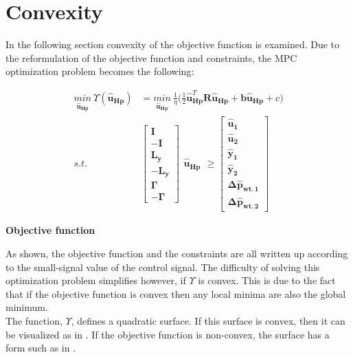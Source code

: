 \section{Convexity}
\label{convexity}
In the following section convexity of the objective function is examined. 
Due to the reformulation of the objective function and constraints, the MPC optimization problem becomes the following: 

\begin{align}
\underset{\bm{\hat{u}_{Hp}}}{min} \:  \Upsilon(\bm{\hat{u}}_{\bm{Hp}}) &= \underset{\bm{\hat{u}_{Hp}}}{min} \:  \frac{1}{\eta}\bigg( \frac{1}{2} \bm{\hat{u}}_{\bm{Hp}}^{T} \bm{R} \bm{\hat{u}}_{\bm{Hp}} + \bm{b} \bm{\hat{u}}_{\bm{Hp}} + c \bigg) \label{eq:obj_final1}\\
%
s.t. \:\:\:\:\:	&\begin{bmatrix}
		\bm{I} 	\\
		-\bm{I} 	\\
		\bm{L_{y}}	\\
		-\bm{L_{y}}	\\
		\bm{\Gamma}	\\
		-\bm{\Gamma}
	\end{bmatrix}
	\begin{matrix}
			\bm{\hat{u}_{Hp}}
	\end{matrix}
	\geq 
	\begin{bmatrix}
			\bm{\hat{u}_{1}}	\\
			\bm{\hat{u}_{2}}	\\
			\bm{\hat{y}_{1}}	\\
			\bm{\hat{y}_{2}}	\\
			\bm{\Delta \hat{p}_{wt,1}}	\\
			\bm{\Delta \hat{p}_{wt,2}}	
	\end{bmatrix} \nonumber
\end{align}

\textbf{Objective function}

As shown, the objective function and the constraints are all written up according to the small-signal value of the control signal. The difficulty of solving this optimization problem simplifies however, if $\Upsilon$ is convex. This is due to the fact that if the objective function is convex then any local minima are also the global minimum. 
\\
The function, $\Upsilon$, defines a quadratic surface. If this surface is convex, then it can be visualized as in . If the objective function is non-convex, the surface has a form such as in . 

